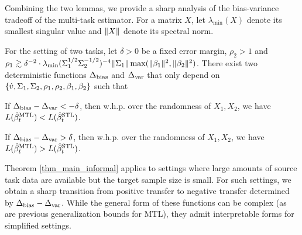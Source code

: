 Combining the two lemmas, we provide a sharp analysis of the bias-variance tradeoff of the multi-task estimator.
For a matrix $X$, let $\lambda_{\min}(X)$ denote its smallest singular value and $\|X\|$ denote its spectral norm.
\begin{theorem}\label{thm_main_informal}
	For the setting of two tasks, let $\delta > 0$ be a fixed error margin, $\rho_2 > 1$ and $\rho_1 \gtrsim \delta^{-2}\cdot \lambda_{\min}(\Sigma_1^{1/2}\Sigma_2^{-1/2})^{-4} \|\Sigma_1\| \max(\|\beta_1\|^2, \|\beta_2\|^2)$.
 	There exist two deterministic functions $\Delta_{\text{bias}}$ and $\Delta_{\text{var}}$ that only depend on $\{\hat{v}, \Sigma_1, \Sigma_2, \rho_1, \rho_2, \beta_1, \beta_2\}$ such that
	\squishlist
		\item If $\Delta_{\text{bias}} - \Delta_{\text{var}} < -\delta$, then w.h.p. over the randomness of $X_1, X_2$, we have $L(\hat{\beta}_t^{\text{MTL}}) < L(\hat{\beta}_t^{\text{STL}})$.
		\item If $\Delta_{\text{bias}} - \Delta_{\text{var}} > \delta$, then w.h.p. over the randomness of $X_1, X_2$, we have $L(\hat{\beta}_t^{\text{MTL}}) > L(\hat{\beta}_t^{\text{STL}})$.
	\squishend
\end{theorem}

Theorem \ref{thm_main_informal} applies to settings where large amounts of source task data are available but the target sample size is small.
For such settings, we obtain a sharp transition from positive transfer to negative transfer determined by $\Delta_{\text{bias}} - \Delta_{\text{var}}$.
While the general form of these functions can be complex (as are previous generalization bounds for MTL), they admit interpretable forms for simplified settings.

